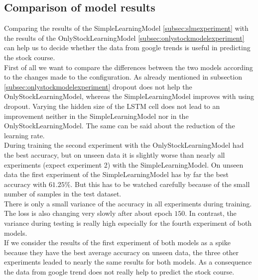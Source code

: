 \subsection{Comparison of model results}
\label{subsec:compmodelresults}	
Comparing the results of the SimpleLearningModel \ref{subsec:slmexperiment} with the results of the OnlyStockLearningModel \ref{subsec:onlystockmodelexperiment} can help us to decide whether the data from google trends is useful in predicting the stock course.\\
First of all we want to compare the differences between the two models according to the changes made to the configuration. As already mentioned in subsection \ref{subsec:onlystockmodelexperiment} dropout does not help the OnlyStockLearningModel, whereas the SimpleLearningModel improves with using dropout. Varying the hidden size of the LSTM cell does not lead to an improvement neither in the SimpleLearningModel nor in the OnlyStockLearningModel. The same can be said about the reduction of the learning rate.\\
During training the second experiment with the OnlyStockLearningModel had the best accuracy, but on unseen data it is slightly worse than nearly all experiments (expect experiment 2) with the SimpleLearningModel. On unseen data the first experiment of the SimpleLearningModel has by far the best accuracy with $61.25\%$. But this has to be watched carefully because of the small number of samples in the test dataset.\\
There is only a small variance of the accuracy in all experiments during training. The loss is also changing very slowly after about epoch $150$. In contrast, the variance during testing is really high especially for the fourth experiment of both models.\\
If we consider the results of the first experiment of both models as a spike because they have the best average accuracy on unseen data, the three other experiments leaded to nearly the same results for both models. As a consequence the data from google trend does not really help to predict the stock course.

